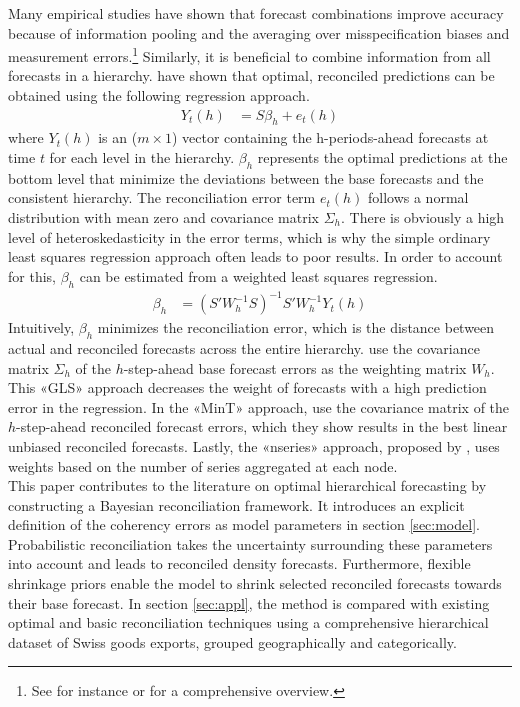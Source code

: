 \documentclass[a4paper,fleqn,11pt]{article}
\begin{document}
Many empirical studies have shown that forecast combinations improve accuracy because of information pooling and the averaging over misspecification biases and measurement errors.\footnote{See for instance \cite{Timmermann2006} or \cite{Watson2004} for a comprehensive overview.} Similarly, it is beneficial to combine information from all forecasts in a hierarchy. \cite{Hyndman2011} have shown that optimal, reconciled predictions can be obtained using the following regression approach.
\begin{align}
Y_t(h) &= S\beta_{h} + e_t(h)
\end{align}
where $Y_t(h)$ is an ($m \times 1$) vector containing the h-periods-ahead forecasts at time $t$ for each level in the hierarchy. $\beta_{h}$ represents the optimal predictions at the bottom level that minimize the deviations between the base forecasts and the consistent hierarchy. The reconciliation error term $e_t(h)$ follows a normal distribution with mean zero and covariance matrix $\Sigma_h$. There is obviously a high level of heteroskedasticity in the error terms, which is why the simple ordinary least squares regression approach often leads to poor results. In order to account for this, $\beta_h$ can be estimated from a weighted least squares regression.
\begin{align}
\label{eq:reg}
\beta_{h} &= \left(S'W_h^{-1}S \right)^{-1} S'W_h^{-1}Y_t(h)
\end{align}
Intuitively, $\beta_h$ minimizes the reconciliation error, which is the distance between actual and reconciled forecasts across the entire hierarchy. \cite{Hyndman2016} use the covariance matrix $\Sigma_h$ of the $h$-step-ahead base forecast errors as the weighting matrix $W_h$. This «GLS» approach decreases the weight of forecasts with a high prediction error in the regression. In the «MinT» approach, \cite{Wickramasuriya2015} use the covariance matrix of the $h$-step-ahead reconciled forecast errors, which they show results in the best linear unbiased reconciled forecasts. Lastly, the «nseries» approach, proposed by \cite{Athanasopoulos2017}, uses weights based on the number of series aggregated at each node.\\

This paper contributes to the literature on optimal hierarchical forecasting by constructing a Bayesian reconciliation framework. It introduces an explicit definition of the coherency errors as model parameters in section \ref{sec:model}. Probabilistic reconciliation takes the uncertainty surrounding these parameters into account and leads to reconciled density forecasts. Furthermore, flexible shrinkage priors enable the model to shrink selected reconciled forecasts towards their base forecast. In section \ref{sec:appl}, the method is compared with existing optimal and basic reconciliation techniques using a comprehensive hierarchical dataset of Swiss goods exports, grouped geographically and categorically.
\end{document}
